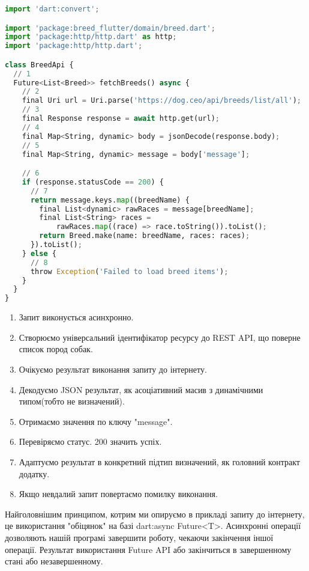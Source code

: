 \begin{lstlisting}[style=light, language=Python,label={lst:flutter_networking},caption=Flutter Networking]
import 'dart:convert';

import 'package:breed_flutter/domain/breed.dart';
import 'package:http/http.dart' as http;
import 'package:http/http.dart';

class BreedApi {
  // 1
  Future<List<Breed>> fetchBreeds() async {
    // 2
    final Uri url = Uri.parse('https://dog.ceo/api/breeds/list/all');
    // 3
    final Response response = await http.get(url);
    // 4
    final Map<String, dynamic> body = jsonDecode(response.body);
    // 5
    final Map<String, dynamic> message = body['message'];

    // 6
    if (response.statusCode == 200) {
      // 7
      return message.keys.map((breedName) {
        final List<dynamic> rawRaces = message[breedName];
        final List<String> races =
            rawRaces.map((race) => race.toString()).toList();
        return Breed.make(name: breedName, races: races);
      }).toList();
    } else {
      // 8
      throw Exception('Failed to load breed items');
    }
  }
}
\end{lstlisting}

\begin{enumerate}
    \item Запит виконується асинхронно.
    \item Створюємо універсальний ідентифікатор ресурсу до REST API, що поверне список пород собак.
    \item Очікуємо результат виконання запиту до інтернету.
    \item Декодуємо JSON результат, як асоціативний масив з динамічними типом(тобто не визначений).
    \item Отримаємо значення по ключу "message".
    \item Перевіряємо статус. 200 значить успіх.
    \item Адаптуємо результат в конкретний підтип визначений, як головний контракт додатку.
    \item Якщо невдалий запит повертаємо помилку виконання.
\end{enumerate}

Найголовнішим принципом, котрим ми опируємо в прикладі запиту до інтернету, це використання "обіцянок" на базі dart:async Future<T>.
Асинхронні операції дозволяють нашій програмі завершити роботу, чекаючи закінчення іншої операції.
Результат використання Future API або закінчиться в завершенному стані або незавершенному.

